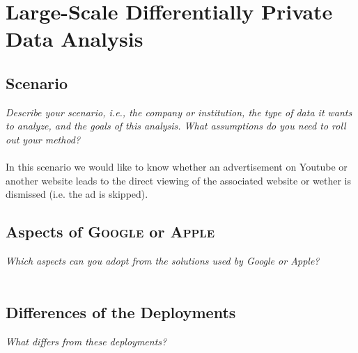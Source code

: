 \documentclass{report}
\begin{document}
	\section{Large-Scale Differentially Private Data Analysis}
	\startsection
		\renewcommand{\thesubsection}{\thesection.\alph{subsection}}
		\subsection{Scenario}
		\startsubsection
			\textit{Describe your scenario, i.e., the company or institution, the type of data it wants to analyze, and the goals of this analysis. What assumptions do you need to roll out your method?} \\ \\
			In this scenario we would like to know whether an advertisement on Youtube or another website leads to the direct viewing of the associated website or wether is dismissed (i.e. the ad is skipped). 
		\closesection
		\subsection{Aspects of \textsc{Google} or \textsc{Apple}}
		\startsubsection
			\textit{Which aspects can you adopt from the solutions used by Google or Apple?} \\ \\
		\closesection
		\subsection{Differences of the Deployments}
		\startsubsection
			\textit{What differs from these deployments?} \\ \\
		\closesection
	\closesection
\end{document}
